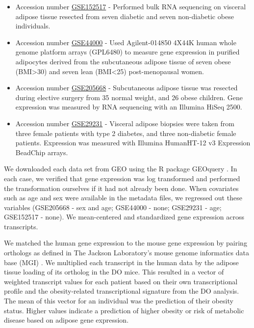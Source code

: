 \documentclass[
]{article}
\begin{document}
\begin{itemize}
\item
  Accession number
  \href{https://www.ncbi.nlm.nih.gov/geo/query/acc.cgi?acc=GSE152517}{GSE152517}
  - Performed bulk RNA sequencing on visceral adipose tissue resected
  from seven diabetic and seven non-diabetic obese individuals.
\item
  Accession number
  \href{https://www.ncbi.nlm.nih.gov/geo/query/acc.cgi?acc=GSE44000}{GSE44000}
  - Used Agilent-014850 4X44K human whole genome platform arrays
  (GPL6480) to measure gene expression in purified adipocytes derived
  from the subcutaneous adipose tissue of seven obese
  (BMI\textgreater30) and seven lean (BMI\textless25) post-menopausal
  women.
\item
  Accession number
  \href{https://www.ncbi.nlm.nih.gov/geo/query/acc.cgi?acc=GSE205668}{GSE205668}
  - Subcutaneous adipose tissue was resected during elective surgery
  from 35 normal weight, and 26 obese children. Gene expression was
  measured by RNA sequencing with an Illumina HiSeq 2500.
\item
  Accession number
  \href{https://www.ncbi.nlm.nih.gov/geo/query/acc.cgi?acc=GSE29231}{GSE29231}
  - Visceral adipose biopsies were taken from three female patients with
  type 2 diabetes, and three non-diabetic female patients. Expression
  was measured with Illumina HumanHT-12 v3 Expression BeadChip arrays.
\end{itemize}

We downloaded each data set from GEO using the R package GEOquery
\cite{geoquery}. In each case, we verified that gene expression was log
transformed and performed the transformation ourselves if it had not
already been done. When covariates such as age and sex were available in
the metadata files, we regressed out these variables (GSE205668 - sex
and age; GSE44000 - none; GSE29231 - age; GSE152517 - none). We
mean-centered and standardized gene expression across transcripts.

We matched the human gene expression to the mouse gene expression by
pairing orthologs as defined in The Jackson Laboratory's mouse genome
informatics data base (MGI) \cite{pmid38531069}. We multiplied each
transcript in the human data by the adipose tissue loading of its
ortholog in the DO mice. This resulted in a vector of weighted
transcript values for each patient based on their own transcriptional
profile and the obesity-related transcriptional signature from the DO
analysis. The mean of this vector for an individual was the prediction
of their obesity status. Higher values indicate a prediction of higher
obesity or risk of metabolic disease based on adipose gene expression.
\end{document}
